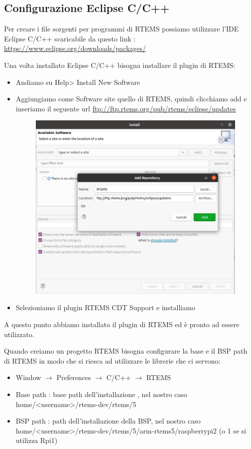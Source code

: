 \documentclass[10pt, a4paper]{article}
\begin{document}
\begin{flushleft}
\newpage
\section{Configurazione Eclipse C/C++} 
Per creare i file sorgenti per programmi di RTEMS possiamo utilizzare l'IDE Eclipse C/C++ scaricabile da questo link :
\url{https://www.eclipse.org/downloads/packages/}


Una volta installato Eclipse C/C++ bisogna installare il plugin di RTEMS:
\begin{itemize}
\item Andiamo su Help> Install New Software
\item Aggiungiamo come Software site quello di RTEMS, quindi clicchiamo add e inseriamo il seguente url \url{ftp://ftp.rtems.org/pub/rtems/eclipse/updates}
\begin{figure}[h!]
\includegraphics[width=\linewidth]{ftp-rtems-eclipse.png}
\end{figure}
\item Selezioniamo il plugin RTEMS CDT Support e installiamo
\end{itemize}

A questo punto abbiamo installato il plugin di RTEMS ed è pronto ad essere utilizzato.

\newpage

Quando creiamo un progetto RTEMS bisogna configurare la base e il BSP path di RTEMS in modo che si riesca ad utilizzare le librerie che ci servono:
\begin{itemize}
\item Window $\rightarrow$ Preferences $\rightarrow$ C/C++ $\rightarrow$ RTEMS
\item Base path : base path dell'installazione , nel nostro caso home/<username>/rtems-dev/rtems/5
\item BSP path : path dell'installazione della BSP, nel nostro caso home/<username>/rtems-dev/rtems/5/arm-rtems5/raspberrypi2 (o 1 se si utilizza Rpi1)
\end{itemize}


\end{flushleft}
\end{document}
